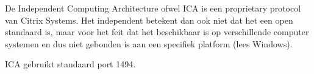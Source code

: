 De Independent Computing Architecture ofwel ICA is een proprietary protocol van Citrix Systems. Het independent betekent dan ook niet dat het een open standaard is, maar voor het feit dat het beschikbaar is op verschillende computer systemen en dus niet gebonden is aan een specifiek platform (lees Windows).

ICA gebruikt standaard port 1494.
